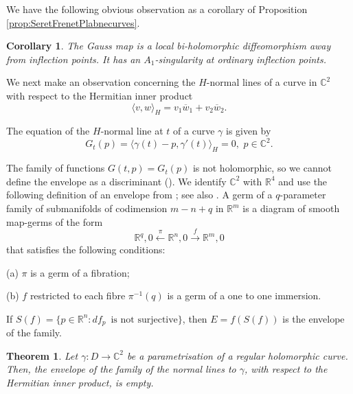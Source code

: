 \documentclass[12pt,a4paper]{article}
\newtheorem{theo}[prop]{Theorem}
\newtheorem{cor}[prop]{Corollary}
\begin{document}
We have the following obvious observation as a corollary of Proposition \ref{prop:SeretFrenetPlabnecurves}.

\begin{cor}
The Gauss map is a local bi-holomorphic diffeomorphism away from inflection points. It has an $A_1$-singularity at ordinary inflection points. 
\end{cor}

We next make an observation concerning the $H$-normal lines of a curve in $\mathbb C^2$ with respect to the Hermitian inner product 
$$
\langle v,w\rangle_H=v_1\overline{w}_1+v_2\overline{w}_2.
$$

The equation of the $H$-normal line at $t$ of a curve $\gamma$  is given by 
$$
G_t(p)=\langle \gamma(t)-p, \gamma'(t)\rangle_H=0, \,\, p\in \mathbb C^2.
$$

The family of functions $G(t,p)=G_t(p)$ is not holomorphic, so we cannot define the envelope as a discriminant (\cite{BillEnvelopes}). 
We identify $\mathbb C^2$ with $\mathbb R^4$ and use the following definition of an envelope from \cite{ThomEnv}; see also \cite{MarioJorge}. 
A  germ of a $q$-parameter family of submanifolds of codimension $m-n+q$ in $\mathbb R^m$ is a 
diagram of smooth map-germs of the form 
$$
\mathbb R^q,0 \xleftarrow{\pi} \mathbb R^n,0 \xrightarrow{f}\mathbb R^m,0
$$
that satisfies the following conditions:

(a) $\pi$ is a germ of a fibration;

(b) $f$ restricted to each fibre $\pi^{-1}(q)$ is a germ of a one to one immersion.

If $S(f)=\{p\in \mathbb R^n: df_p \, \mbox{ is not surjective}\}$, then $E=f(S(f))$ is the envelope of the family.
 

\begin{theo} \label{theo:EmptyHermeEnv}
Let $\gamma:D\to \mathbb C^2$  be a parametrisation of a regular holomorphic curve. Then,
the envelope of the family of the normal lines to $\gamma$, with respect to the Hermitian inner product,  is empty.
\end{theo}
\end{document}
